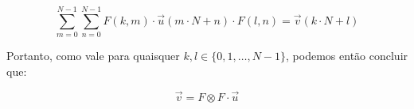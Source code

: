 \documentclass[]{abntex2}
\begin{document}
\begin{equation*}
	\sum_{m=0}^{N-1} \sum_{n=0}^{N-1} F(k,m) \cdot \vec{u}(m\cdot N+n) \cdot F(l,n) =  \vec{v}(k\cdot N + l)
\end{equation*}

Portanto, como vale para quaisquer $k,l \in \{0,1,\ldots, N-1\}$, podemos então concluir que:

\begin{tcolorbox}
\[
	\vec{v} = F\otimes F \cdot \vec{u}
\]
\end{tcolorbox}
\end{document}
